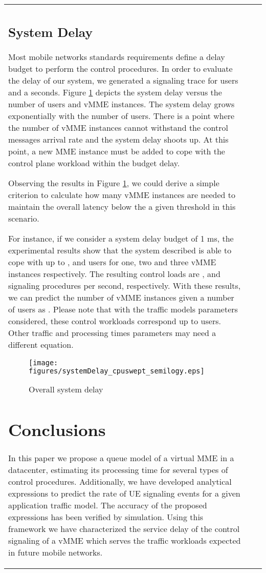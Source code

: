\documentclass[conference]{IEEEtran}
\begin{document}
\begin{table*}[tb]
{\begin{tabularx}{\textwidth}{l|l|X}
{\subsection{System Delay}

 Most mobile networks standards requirements define a delay budget to perform the control procedures. In order to evaluate the delay of our system, we generated a signaling trace for  users and a  seconds. Figure \ref{fig:system-delay} depicts the system delay versus the number of users and vMME instances. The system delay grows exponentially with the number of users. There is a point where the number of vMME instances cannot withstand the control messages arrival rate and the system delay shoots up. At this point, a new MME instance must be added to cope with the control plane workload within the budget delay.

 Observing the results in Figure \ref{fig:system-delay}, we could derive a simple criterion to calculate how many vMME instances are needed to maintain the overall latency below the a given threshold in this scenario.
 
For instance, if we consider a system delay budget of 1 ms, the experimental results show that the system described is able to cope with up to ,  and  users for one, two and three vMME instances respectively. The resulting control loads are ,  and  signaling procedures per second, respectively. With these results, we can predict the number of vMME instances  given a number of users  as .  Please note that with the traffic models parameters considered, these control workloads correspond up to  users. Other traffic and processing times parameters may need a different equation. 





\begin{figure}[tb]
\begin{center}
\texttt{[image: figures/systemDelay\_cpuswept\_semilogy.eps]}
\end{center}
\caption{Overall system delay}
\label{fig:system-delay}
\end{figure}


\section{Conclusions}
\label{sec:conclusions}
 
  In this paper we propose a queue model of a virtual MME in a datacenter, estimating its processing time for several types of control procedures.  Additionally, we have developed analytical expressions to predict the rate of UE signaling events for a given application traffic model. The accuracy of the proposed expressions has been verified by simulation.
  Using this framework we have characterized the service delay of the control signaling of a vMME which serves the traffic workloads expected in future mobile networks. 
    
}
\end{tabularx}}
\end{table*}
\end{document}
